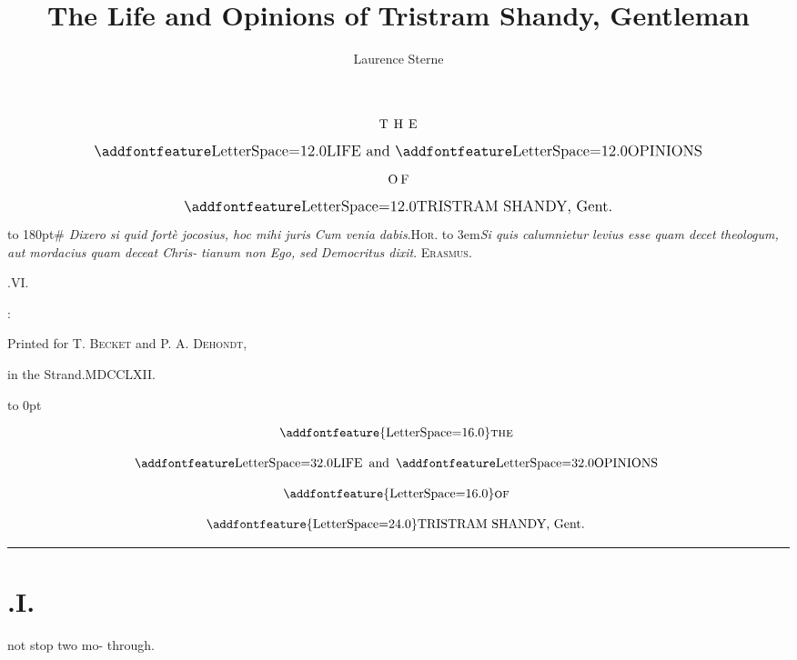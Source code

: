 \documentclass{article}
\title{The Life and Opinions of Tristram Shandy, Gentleman}
\author{Laurence Sterne}
\begin{document}
\pagestyle{empty}
\null
\vfill
$$\vbox{\openup 10pt\halign{\hss #\hss\cr
\hbox to 3em{T H E}\cr
\large \ls{LIFE} and \ls{OPINIONS}\cr
\hbox to 1.6em{O F}\cr
\large \ls{TRISTRAM SHANDY}, Gent.\cr
}}$$
\vfill
\newpage
\null
\newpage %
\vbox{\openup 10pt}
\vfill
\vbox{\openup -2pt\halign to 180pt{\footnotesize #\cr
\textit{Dixero si quid fortè jocosius, hoc mihi juris}\hfill\cr
\textit{Cum venia dabis}.\tsh \hfill \textsc{Hor.}\cr
\noalign{\vskip 4pt}
\hbox to 3em{\tsh}\textit{Si quis calumnietur levius esse quam decet}\cr
\quad\textit{theologum, aut mordacius quam deceat Chris-}\cr
\quad\textit{tianum \tsh non Ego, sed Democritus dixit}.\tsh\cr
\hfill\textsc{Erasmus}.\cr}}
\vfill
\centerline{.\quad VI.}
\vfill
\centerline{:}
\centerline{\small Printed for T. \textsc{Becket} and P. A. \textsc{Dehondt},}
\centerline{\small in the Strand.\quad MDCCLXII.}

\newpage
\null
\newpage
\pagestyle{fancy}
\thispagestyle{empty}
\setcounter{page}{1}
\hbox{}\vskip -36pt
\moveright 88pt\vbox to 0pt{\hsize
40pt\vss}

\[\vbox{\openup 12pt\halign{\hss # \hss\cr
\addfontfeature{LetterSpace=16.0}\textsc{the}\cr
\lsss{LIFE}\enspace and\enspace \lsss{OPINIONS}\cr
\addfontfeature{LetterSpace=16.0}\textsc{of}\cr
{\addfontfeature{LetterSpace=24.0}TRISTRAM SHANDY}, Gent.\cr}}\]

\vskip 12pt
\hrule

\bigskip
\setlength{\baselineskip}{14pt}  %
\sloppy

\section{.\enspace I.}

 not stop two mo-\break
{}\break
{}
through.\tsh
\end{document}

